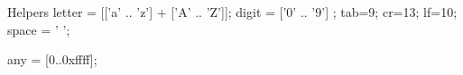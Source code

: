 \label{helpers}
Helpers
    letter = [['a' .. 'z'] + ['A' .. 'Z']];
    digit = ['0' .. '9'] ;
    tab=9; cr=13; lf=10; space = ' ';

    any = [0..0xffff];